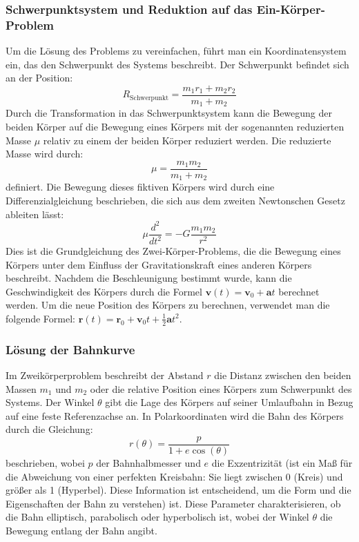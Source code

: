\documentclass[a4paper,12pt,twoside]{article}
\begin{document}
\subsubsection{Schwerpunktsystem und Reduktion auf das Ein-Körper-Problem}
Um die Lösung des Problems zu vereinfachen, führt man ein Koordinatensystem ein, das den Schwerpunkt des Systems beschreibt. Der Schwerpunkt befindet sich an der Position:
\[
R_{\text{Schwerpunkt}} = \frac{m_1 r_1 + m_2 r_2}{m_1 + m_2}
\]
Durch die Transformation in das Schwerpunktsystem kann die Bewegung der beiden Körper auf die Bewegung eines Körpers mit der sogenannten reduzierten Masse \( \mu \) relativ zu einem der beiden Körper reduziert werden. Die reduzierte Masse wird durch:
\[
\mu = \frac{m_1 m_2}{m_1 + m_2}
\]
definiert. Die Bewegung dieses fiktiven Körpers wird durch eine Differenzialgleichung beschrieben, die sich aus dem zweiten Newtonschen Gesetz ableiten lässt:
\[
\mu \frac{d^2}{dt^2} = - G \frac{m_1 m_2}{r^2} 
\]
Dies ist die Grundgleichung des Zwei-Körper-Problems, die die Bewegung eines Körpers unter dem Einfluss der Gravitationskraft eines anderen Körpers beschreibt.
Nachdem die Beschleunigung bestimmt wurde, kann die Geschwindigkeit des Körpers durch die Formel \( \mathbf{v}(t) = \mathbf{v}_0 + \mathbf{a} t \) berechnet werden. Um die neue Position des Körpers zu berechnen, verwendet man die folgende Formel: \( \mathbf{r}(t) = \mathbf{r}_0 + \mathbf{v}_0 t + \frac{1}{2} \mathbf{a} t^2 \).

\subsubsection{Lösung der Bahnkurve}
Im Zweikörperproblem beschreibt der Abstand \( r \) die Distanz zwischen den beiden Massen \( m_1 \) und \( m_2 \) oder die relative Position eines Körpers zum Schwerpunkt des Systems. Der Winkel \( \theta \) gibt die Lage des Körpers auf seiner Umlaufbahn in Bezug auf eine feste Referenzachse an. In Polarkoordinaten wird die Bahn des Körpers durch die Gleichung:
\[
r(\theta) = \frac{p}{1 + e \cos(\theta)}
\]
beschrieben, wobei \( p \) der Bahnhalbmesser und \( e \) die Exzentrizität (ist ein Maß für die Abweichung von einer perfekten Kreisbahn: Sie liegt zwischen 0 (Kreis) und größer als 1 (Hyperbel). Diese Information ist entscheidend, um die Form und die Eigenschaften der Bahn zu verstehen) ist. Diese Parameter charakterisieren, ob die Bahn elliptisch, parabolisch oder hyperbolisch ist, wobei der Winkel \( \theta \) die Bewegung entlang der Bahn angibt.
\end{document}
